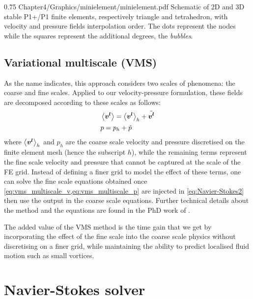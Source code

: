 \begin{figureth}
{0.75}
{Chapter4/Graphics/minielement/minielement.pdf}
{Schematic of 2D and 3D stable P1+/P1 finite elements, respectively triangle and tetrahedron, with velocity and pressure fields interpolation order.
The dots represent the nodes while the squares represent the additional degrees, the \emph{bubbles}. }
\label{fig:minielement}
\end{figureth}

\subsection{Variational multiscale (VMS)}
As the name indicates, this approach considers two scales of phenomena: the coarse and fine scales. Applied to our velocity-pressure
formulation, these fields are decomposed according to these scales as follows:
\begin{align}
\label{eq:vms_multiscale_v}
 &\left \langle \boldsymbol{v^l} \right \rangle = \left \langle \boldsymbol{v^l} \right \rangle_h + \tilde{\boldsymbol{v^l}} \\ 
\label{eq:vms_multiscale_p}
 &p = p_h + \tilde{p}
\end{align}
where $\left \langle \boldsymbol{v^l} \right \rangle_h$ and $p_h$ are the coarse scale velocity and pressure discretised on the finite element mesh (hence the subscript $h$), 
while the remaining terms represent the fine scale velocity and pressure that cannot be captured at the scale of the FE grid. Instead 
of defining a finer grid to model the effect of these terms, one can solve the fine scale equations obtained once \cref{eq:vms_multiscale_v,eq:vms_multiscale_p}
are injected in \cref{eq:Navier-Stokes2} then use the output in the coarse scale equations. 
Further technical details about the method and the equations are found in the PhD work of \citet{hachem_stabilized_2009}. 

The added value of the VMS method is the time gain that we get 
by incorporating the effect of the fine scale into the 
coarse scale physics without discretising on a finer grid, 
while maintaining the ability to predict localised fluid motion such as small vortices.

\section{Navier-Stokes solver}

